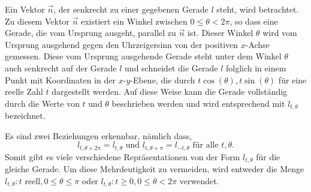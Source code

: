 Ein Vektor $\vec{n}$, der senkrecht zu einer gegebenen Gerade $l$ steht, wird betrachtet. Zu diesem Vektor $\vec{n}$ existiert ein Winkel zwischen $0 \le \theta < 2\pi$, so dass eine Gerade, die vom Ursprung ausgeht, parallel zu $\vec{n}$ ist. Dieser Winkel $\theta$ wird vom Ursprung ausgehend gegen den Uhrzeigersinn von der positiven $x$-Achse gemessen. Diese vom Ursprung ausgehende Gerade steht unter dem Winkel $\theta$ auch senkrecht auf der Gerade $l$ und schneidet die Gerade $l$ folglich in einem Punkt mit Koordinaten in der $x$-$y$-Ebene, die durch $t\cos(\theta), t\sin(\theta)$ für eine reelle Zahl $t$ dargestellt werden. Auf diese Weise kann die Gerade vollständig durch die Werte von $t$ und $\theta$ beschrieben werden und wird entsprechend mit $l_{t,\theta}$ bezeichnet.

Es sind zwei Beziehungen erkennbar, nämlich dass,
\begin{equation}
	l_{t,\theta+2\pi} = l_{t,\theta} \text{ und } l_{t,\theta+\pi} = l_{-t,\theta} \text{ für alle } t, \theta.
\nonumber\end{equation}
\sloppy Somit gibt es viele verschiedene Repräsentationen von der Form $l_{t,\theta}$ für die gleiche Gerade. Um diese Mehrdeutigkeit zu vermeiden, wird entweder die Menge $l_{t,\theta}: t \text{ reell},  0 \le \theta \le \pi$ oder $l_{t,\theta} : t \ge 0,  0 \le \theta < 2\pi$ verwendet.
